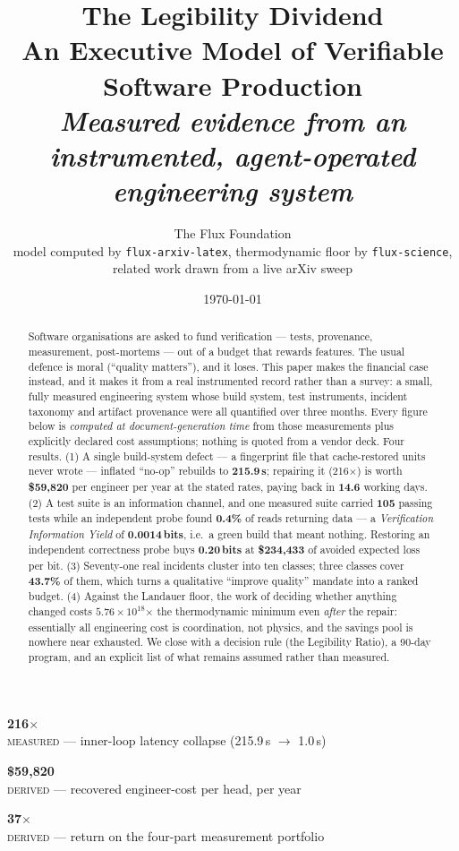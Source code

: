 \documentclass[11pt,a4paper]{article}
\title{\textbf{The Legibility Dividend}\\[6pt]\large An Executive Model of Verifiable Software Production\\[4pt]\normalsize\itshape Measured evidence from an instrumented, agent-operated engineering system}
\author{The Flux Foundation\\\small model computed by \texttt{flux-arxiv-latex}, thermodynamic floor by \texttt{flux-science},\\\small related work drawn from a live arXiv sweep}
\date{\today}
\newcommand{\measured}[1]{\textcolor{sigilcyan}{\textbf{#1}}}
\newcommand{\derivedv}[1]{\textcolor{sigilviolet}{\textbf{#1}}}
\newcommand{\kpi}[3]{\begin{minipage}[t]{0.31\textwidth}\begin{tcolorbox}[colback=panelbg,colframe=slate,boxrule=0.5pt,arc=2pt,halign=center]{\large\bfseries\textcolor{#1}{#2}}\\[2pt]{\scriptsize #3}\end{tcolorbox}\end{minipage}}
\begin{document}
\maketitle
\vspace{-12pt}\noindent
\kpi{sigilcyan}{216$\times$}{\textsc{measured} --- inner-loop latency collapse (215.9\,s $\to$ 1.0\,s)}\hfill
\kpi{sigilviolet}{\$59{,}820}{\textsc{derived} --- recovered engineer-cost per head, per year}\hfill
\kpi{sigilamber}{37$\times$}{\textsc{derived} --- return on the four-part measurement portfolio}

\vspace{6pt}

\begin{abstract}\noindent
Software organisations are asked to fund verification --- tests, provenance, measurement, post-mortems --- out of a budget that rewards features. The usual defence is moral (``quality matters''), and it loses. This paper makes the financial case instead, and it makes it from a real instrumented record rather than a survey: a small, fully measured engineering system whose build system, test instruments, incident taxonomy and artifact provenance were all quantified over three months. Every figure below is \emph{computed at document-generation time} from those measurements plus explicitly declared cost assumptions; nothing is quoted from a vendor deck. Four results. (1) A single build-system defect --- a fingerprint file that cache-restored units never wrote --- inflated ``no-op'' rebuilds to \measured{215.9\,s}; repairing it (216$\times$) is worth \derivedv{\$59{,}820} per engineer per year at the stated rates, paying back in \derivedv{14.6} working days. (2) A test suite is an information channel, and one measured suite carried \measured{105} passing tests while an independent probe found \measured{0.4\%} of reads returning data --- a \emph{Verification Information Yield} of \derivedv{0.0014\,bits}, i.e.\ a green build that meant nothing. Restoring an independent correctness probe buys \derivedv{0.20\,bits} at \derivedv{\$234{,}433} of avoided expected loss per bit. (3) Seventy-one real incidents cluster into ten classes; three classes cover \measured{43.7\%} of them, which turns a qualitative ``improve quality'' mandate into a ranked budget. (4) Against the Landauer floor, the work of deciding whether anything changed costs \derivedv{$5.76\times10^{18}$}$\times$ the thermodynamic minimum even \emph{after} the repair: essentially all engineering cost is coordination, not physics, and the savings pool is nowhere near exhausted. We close with a decision rule (the Legibility Ratio), a 90-day program, and an explicit list of what remains assumed rather than measured.
\end{abstract}
\end{document}
